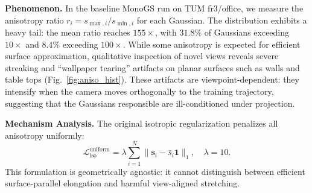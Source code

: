 \documentclass[conference]{IEEEtran}
\begin{document}
\textbf{Phenomenon.}
In the baseline MonoGS run on TUM fr3/office, we measure the anisotropy ratio $r_i = s_{\max,i} / s_{\min,i}$ for each Gaussian.
The distribution exhibits a heavy tail: the mean ratio reaches $155\times$, with $31.8\%$ of Gaussians exceeding $10\times$ and $8.4\%$ exceeding $100\times$.
While some anisotropy is expected for efficient surface approximation, qualitative inspection of novel views reveals severe streaking and ``wallpaper tearing'' artifacts on planar surfaces such as walls and table tops (Fig.~\ref{fig:aniso_hist}).
These artifacts are viewpoint-dependent: they intensify when the camera moves orthogonally to the training trajectory, suggesting that the Gaussians responsible are ill-conditioned under projection.

\textbf{Mechanism Analysis.}
The original isotropic regularization penalizes all anisotropy uniformly:
\begin{equation}
\mathcal{L}_{\text{iso}}^{\text{uniform}} = \lambda \sum_{i=1}^{N} \|\mathbf{s}_i - \bar{s}_i \mathbf{1}\|_1, \quad \lambda = 10.
\label{eq:iso_uniform}
\end{equation}
This formulation is geometrically agnostic: it cannot distinguish between efficient surface-parallel elongation and harmful view-aligned stretching.
\end{document}

